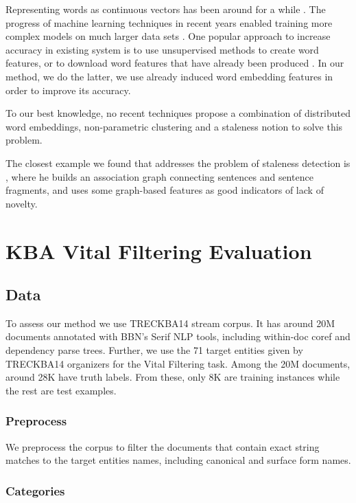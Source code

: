 \documentclass{article}
\begin{document}
Representing words as continuous vectors has been around for a while \cite{Hinton87, Elman90findingstructure}. The progress of machine learning techniques in recent years enabled training more complex models on much larger data sets \cite{mikolovChen}. One popular approach to increase accuracy in existing system is to use unsupervised methods to create word features, or to download word features that have already been produced \cite{Turian10wordrepresentations}. In our method, we do the latter, we use already induced word embedding features in order to improve its accuracy.

To our best knowledge, no recent techniques propose a combination of distributed word embeddings, non-parametric clustering and a staleness notion to solve this problem. 

The closest example we found that addresses the problem of staleness detection is \citet{gamon}, where he builds an association graph connecting sentences and sentence fragments, and uses some graph-based features as good indicators of lack of novelty.

\section{KBA Vital Filtering Evaluation}
\label{evaluation}

\subsection{Data}
\label{data}

To assess our method we use TRECKBA14 stream corpus. It has around 20M documents annotated with BBN's Serif NLP tools, including within-doc coref and dependency parse trees. Further, we use the 71 target entities given by TRECKBA14 organizers for the Vital Filtering task. Among the 20M documents, around 28K have truth labels. From these, only 8K are training instances while the rest are test examples.

\subsubsection{Preprocess}

We preprocess the corpus to filter the documents that contain exact string matches to the target entities names, including canonical and surface form names.

\subsubsection{Categories}
\label{subcat}
\end{document}
